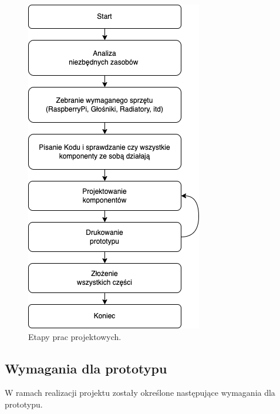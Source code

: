 \documentclass[a4paper,12pt,reqno]{article}
\begin{document}
\begin{figure}[H]%
\centering
\includegraphics[width=0.5\columnwidth]{imgs/etapy.drawio.png}
\caption{Etapy prac projektowych. \cite{img_by_me} \label{etapypracy}}
\quad
\end{figure}

\subsection{Wymagania dla prototypu}

W ramach realizacji projektu zostały określone następujące wymagania dla prototypu.
\end{document}
